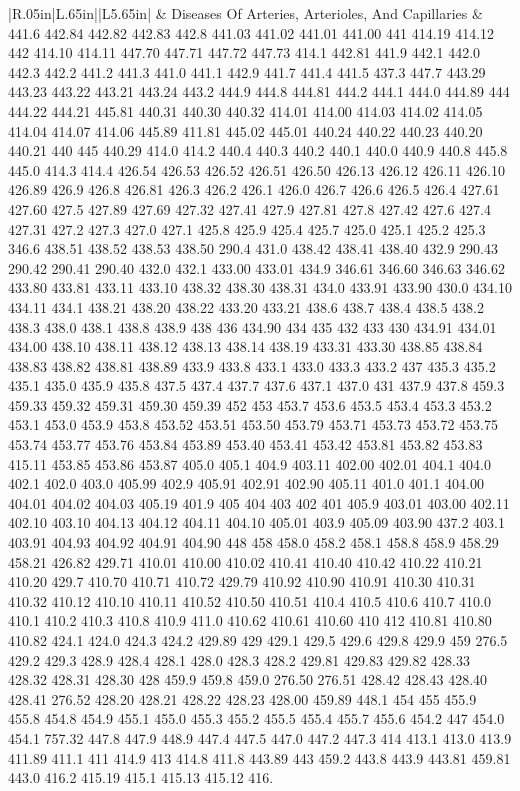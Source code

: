 \begin{longtable}{|R{.05in}|L{.65in}||L{5.65in}|}
   & Diseases Of Arteries, Arterioles, And Capillaries  &  441.6 442.84 442.82 442.83 442.8 441.03 441.02 441.01 441.00 441 414.19 414.12 442 414.10 414.11 447.70 447.71 447.72 447.73 414.1 442.81 441.9 442.1 442.0 442.3 442.2 441.2 441.3 441.0 441.1 442.9 441.7 441.4 441.5 437.3 447.7 443.29 443.23 443.22 443.21 443.24 443.2 444.9 444.8 444.81 444.2 444.1 444.0 444.89 444 444.22 444.21 445.81 440.31 440.30 440.32 414.01 414.00 414.03 414.02 414.05 414.04 414.07 414.06 445.89 411.81 445.02 445.01 440.24 440.22 440.23 440.20 440.21 440 445 440.29 414.0 414.2 440.4 440.3 440.2 440.1 440.0 440.9 440.8 445.8 445.0 414.3 414.4 426.54 426.53 426.52 426.51 426.50 426.13 426.12 426.11 426.10 426.89 426.9 426.8 426.81 426.3 426.2 426.1 426.0 426.7 426.6 426.5 426.4 427.61 427.60 427.5 427.89 427.69 427.32 427.41 427.9 427.81 427.8 427.42 427.6 427.4 427.31 427.2 427.3 427.0 427.1 425.8 425.9 425.4 425.7 425.0 425.1 425.2 425.3 346.6 438.51 438.52 438.53 438.50 290.4 431.0 438.42 438.41 438.40 432.9 290.43 290.42 290.41 290.40 432.0 432.1 433.00 433.01 434.9 346.61 346.60 346.63 346.62 433.80 433.81 433.11 433.10 438.32 438.30 438.31 434.0 433.91 433.90 430.0 434.10 434.11 434.1 438.21 438.20 438.22 433.20 433.21 438.6 438.7 438.4 438.5 438.2 438.3 438.0 438.1 438.8 438.9 438 436 434.90 434 435 432 433 430 434.91 434.01 434.00 438.10 438.11 438.12 438.13 438.14 438.19 433.31 433.30 438.85 438.84 438.83 438.82 438.81 438.89 433.9 433.8 433.1 433.0 433.3 433.2 437 435.3 435.2 435.1 435.0 435.9 435.8 437.5 437.4 437.7 437.6 437.1 437.0 431 437.9 437.8 459.3 459.33 459.32 459.31 459.30 459.39 452 453 453.7 453.6 453.5 453.4 453.3 453.2 453.1 453.0 453.9 453.8 453.52 453.51 453.50 453.79 453.71 453.73 453.72 453.75 453.74 453.77 453.76 453.84 453.89 453.40 453.41 453.42 453.81 453.82 453.83 415.11 453.85 453.86 453.87 405.0 405.1 404.9 403.11 402.00 402.01 404.1 404.0 402.1 402.0 403.0 405.99 402.9 405.91 402.91 402.90 405.11 401.0 401.1 404.00 404.01 404.02 404.03 405.19 401.9 405 404 403 402 401 405.9 403.01 403.00 402.11 402.10 403.10 404.13 404.12 404.11 404.10 405.01 403.9 405.09 403.90 437.2 403.1 403.91 404.93 404.92 404.91 404.90 448 458 458.0 458.2 458.1 458.8 458.9 458.29 458.21 426.82 429.71 410.01 410.00 410.02 410.41 410.40 410.42 410.22 410.21 410.20 429.7 410.70 410.71 410.72 429.79 410.92 410.90 410.91 410.30 410.31 410.32 410.12 410.10 410.11 410.52 410.50 410.51 410.4 410.5 410.6 410.7 410.0 410.1 410.2 410.3 410.8 410.9 411.0 410.62 410.61 410.60 410 412 410.81 410.80 410.82 424.1 424.0 424.3 424.2 429.89 429 429.1 429.5 429.6 429.8 429.9 459 276.5 429.2 429.3 428.9 428.4 428.1 428.0 428.3 428.2 429.81 429.83 429.82 428.33 428.32 428.31 428.30 428 459.9 459.8 459.0 276.50 276.51 428.42 428.43 428.40 428.41 276.52 428.20 428.21 428.22 428.23 428.00 459.89 448.1 454 455 455.9 455.8 454.8 454.9 455.1 455.0 455.3 455.2 455.5 455.4 455.7 455.6 454.2 447 454.0 454.1 757.32 447.8 447.9 448.9 447.4 447.5 447.0 447.2 447.3 414 413.1 413.0 413.9 411.89 411.1 411 414.9 413 414.8 411.8 443.89 443 459.2 443.8 443.9 443.81 459.81 443.0 416.2 415.19 415.1 415.13 415.12 416.\\\hline

\end{longtable}
